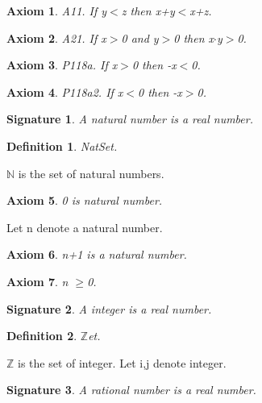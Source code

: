 \documentclass{article}
\newenvironment{forthel}{\begin{leftbar}}{\end{leftbar}}
\newtheorem{axiom}{Axiom}
\newtheorem{definition}{Definition}
\newtheorem{signature}{Signature}
\begin{document}
\begin{forthel}
\begin{axiom} A11. If y$<$z then x+y$<$x+z.

\end{axiom}
\begin{axiom} A21. If x$>$0 and y$>$0 then x$\cdot$y$>$0.

\end{axiom}

\begin{axiom} P118a. If x$>$0 then -x$<$0.

\end{axiom}
\begin{axiom} P118a2. If x$<$0 then -x$>$0.

\end{axiom}




\begin{signature} A natural number is a real number.

\end{signature}

\begin{definition} NatSet.

\end{definition}
$\mathbb{N}$ is the set of natural numbers.

\begin{axiom} 0 is natural number.

\end{axiom}
Let n denote a natural number.
\begin{axiom} n+1 is a natural number.

\end{axiom}

\begin{axiom} n $\geq$0.

\end{axiom}

\begin{signature} A integer is a real number.

\end{signature}

\begin{definition} $\mathbb{Z}$et.

\end{definition}
$\mathbb{Z}$ is the set of integer.
Let i,j denote integer.


\begin{signature} A rational number is a real number.

\end{signature}


\end{forthel}
\end{document}
